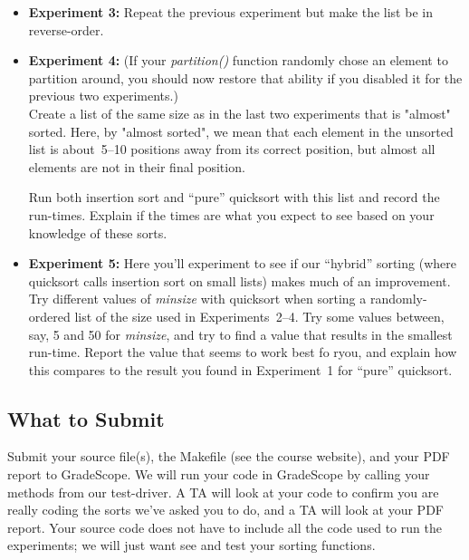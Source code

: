 \documentclass[11pt]{article}
\begin{document}
\begin{itemize}
\item {\bf Experiment 3:} Repeat the previous experiment but make the list be in reverse-order.

\item {\bf Experiment 4:} (If your {\em partition()\/} function randomly chose an element to partition around, you should now restore that ability if you disabled it for the previous two experiments.) \\
Create a list of the same size as in the last two experiments that is "almost" sorted. Here, by "almost
sorted", we mean that each element in the unsorted list is about~5--10 positions away
from its correct position, but almost all elements are not in their final position.

Run both insertion sort and ``pure'' quicksort with this list and record the run-times. Explain if the times are what you expect to see based on your knowledge of these sorts.

\item {\bf Experiment 5:} Here you'll experiment to see if our ``hybrid'' sorting (where  quicksort calls insertion sort on small lists) makes much of an improvement.  Try different values of {\em minsize}  with quicksort when sorting  a randomly-ordered list of the size used in Experiments~2--4.   Try some values between, say, 5 and 50 for  {\em minsize}, and try to find a value that results in the smallest run-time.  Report the value that seems to work best fo ryou, and explain how this compares to the result you found in Experiment~1 for ``pure'' quicksort.

\end{itemize}

\subsection*{What to Submit}

Submit your source file(s), the Makefile (see the course website), and your PDF report to GradeScope.  We will run your code in GradeScope by calling your methods from our test-driver.  A TA will look at your code to confirm you are really coding the sorts we've asked you to do, and a TA will look at your PDF report.  Your source code does not have to include all the code used to run the experiments; we will just want see and test your sorting functions.
\end{document}
